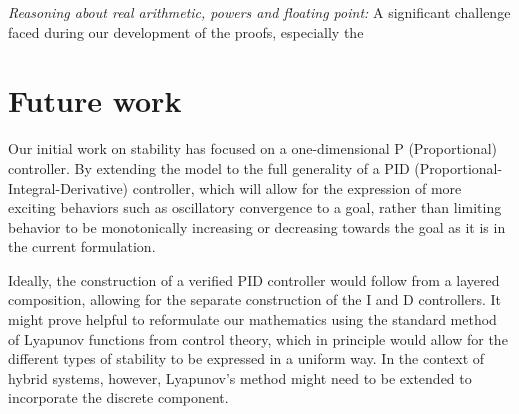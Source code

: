 \documentclass[10pt]{sigplanconf}
\begin{document}



\emph{Reasoning about real arithmetic, powers and floating point: }
A significant challenge faced during our development of the proofs, especially the

\section{Future work}

Our initial work on stability has focused on a one-dimensional P (Proportional) controller. By extending the model to the full generality of a PID (Proportional-Integral-Derivative) controller, which will allow for the expression of more exciting behaviors such as oscillatory convergence to a goal, rather than limiting behavior to be monotonically increasing or decreasing towards the goal as it is in the current formulation.

Ideally, the construction of a verified PID controller would follow from a layered composition, allowing for the separate construction of the I and D controllers. It might prove helpful to reformulate our mathematics using the standard method of Lyapunov functions from control theory, which in principle would allow for the different types of stability to be expressed in a uniform way. In the context of hybrid systems, however, Lyapunov's method might need to be extended to incorporate the discrete component.





\end{document}
